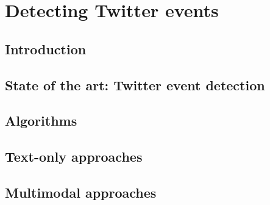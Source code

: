 \chapter{Detecting Twitter events}


\section{Introduction}

\section{State of the art: Twitter event detection}

\section{Algorithms}

\section{Text-only approaches}

\section{Multimodal approaches}